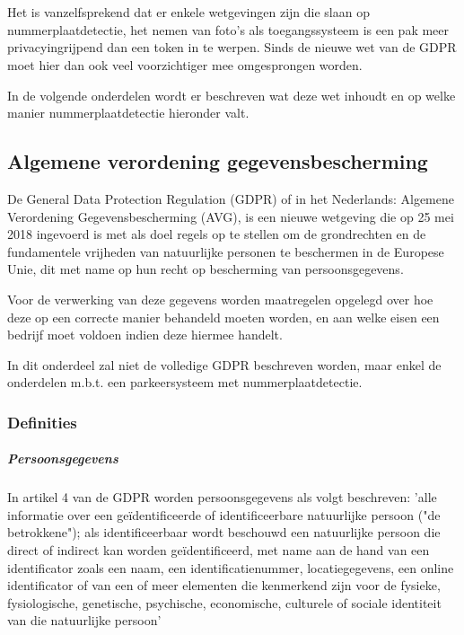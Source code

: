 
\chapter{}
\label{ch:wetgeving-nummerplaatdetectie}

Het is vanzelfsprekend dat er enkele wetgevingen zijn die slaan op nummerplaatdetectie, het nemen van foto's als toegangssysteem is een pak meer privacyingrijpend dan een token in te werpen. Sinds de nieuwe wet van de GDPR moet hier dan ook veel voorzichtiger mee omgesprongen worden.

In de volgende onderdelen wordt er beschreven wat deze wet inhoudt en op welke manier nummerplaatdetectie hieronder valt.

\section{Algemene verordening gegevensbescherming}
De General Data Protection Regulation (GDPR) of in het Nederlands: Algemene Verordening Gegevensbescherming (AVG), is een nieuwe wetgeving die op 25 mei 2018 ingevoerd is met als doel regels op te stellen om de grondrechten en de fundamentele vrijheden van natuurlijke personen te beschermen in de Europese Unie, dit met name op hun recht op bescherming van persoonsgegevens. \autocite{avg2018privacy}

Voor de verwerking van deze gegevens worden maatregelen opgelegd over hoe deze op een correcte manier behandeld moeten worden, en aan welke eisen een bedrijf moet voldoen indien deze hiermee handelt.

In dit onderdeel zal niet de volledige GDPR beschreven worden, maar enkel de onderdelen m.b.t. een parkeersysteem met nummerplaatdetectie.

\subsection{Definities}

\paragraph{Persoonsgegevens}
In artikel 4 van de GDPR worden persoonsgegevens als volgt beschreven: 'alle informatie over een geïdentificeerde of identificeerbare natuurlijke persoon ("de betrokkene"); als identificeerbaar wordt beschouwd een natuurlijke persoon die direct of indirect kan worden geïdentificeerd, met name aan de hand van een identificator zoals een naam, een identificatienummer, locatiegegevens, een online identificator of van een of meer elementen die kenmerkend zijn voor de fysieke, fysiologische, genetische, psychische, economische, culturele of sociale identiteit van die natuurlijke persoon' \autocite{avg2018privacy}

